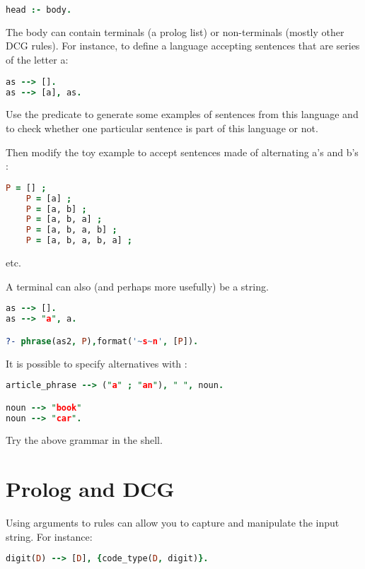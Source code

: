 \documentclass{../../../tp}
\begin{document}
\begin{lstlisting}[language=prolog]
head :- body.
\end{lstlisting}

The body can contain terminals (a prolog list) or non-terminals (mostly other DCG rules). For instance, to define a language accepting sentences that are series of the letter a:

\begin{lstlisting}[language=prolog]
as --> [].
as --> [a], as.
\end{lstlisting}

\begin{instruction}
	Use the  predicate to generate some examples of sentences from this language and to check whether one particular sentence is part of this language or not.
	
	Then modify the toy example to accept sentences made of alternating a's and b's :
	\begin{lstlisting}[language=prolog]
	P = [] ;
	P = [a] ;
	P = [a, b] ;
	P = [a, b, a] ;
	P = [a, b, a, b] ;
	P = [a, b, a, b, a] ;
	\end{lstlisting}
	etc.
\end{instruction}

A terminal can also (and perhaps more usefully) be a string. 
\begin{lstlisting}[language=prolog]
as --> [].
as --> "a", a.

?- phrase(as2, P),format('~s~n', [P]).
\end{lstlisting}

It is possible to specify alternatives with \prologcode{;}:
\begin{lstlisting}[language=prolog]
article_phrase --> ("a" ; "an"), " ", noun.

noun --> "book"                                                            
noun --> "car".
\end{lstlisting}

Try the above grammar in the shell.

\section{Prolog and DCG}

Using arguments to rules can allow you to capture and manipulate the input string. For instance:
\begin{lstlisting}[language=prolog]
digit(D) --> [D], {code_type(D, digit)}.
\end{lstlisting}
\end{document}
